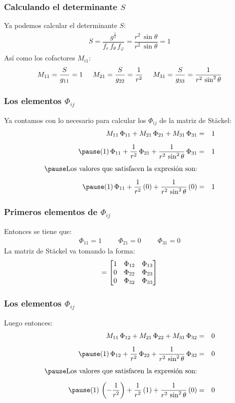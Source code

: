 \documentclass[12pt]{beamer}
\begin{document}
\begin{frame}
\frametitle{Calculando el determinante $S$}
Ya podemos calcular el determinante $S$:
\pause
\begin{align*}
S = \dfrac{g^{\frac{1}{2}}}{f_{r} \, f_{\theta} \, f_{\varphi}} = \dfrac{r^{2} \, \sin \theta}{r^{2} \, \sin \theta} = 1
\end{align*}
\pause
Así como los cofactores $M_{i1}$:
\pause
\begin{align*}
M_{11} = \dfrac{S}{g_{11}} = 1 \hspace{0.5cm} M_{21} = \dfrac{S}{g_{22}} = \dfrac{1}{r^{2}} \hspace{0.5cm} M_{31} = \dfrac{S}{g_{33}} = \dfrac{1}{r^{2} \, \sin^{2} \theta}
\end{align*}
\end{frame}
\begin{frame}
\frametitle{Los elementos $\Phi_{ij}$}
Ya contamos con lo necesario para calcular los $\Phi_{ij}$ de la matriz de Stäckel:
\begin{eqnarray*}
M_{11} \, \Phi_{11} + M_{21} \, \Phi_{21} + M_{31} \, \Phi_{31} &=& 1 \\[0.5em] \pause
(1) \, \Phi_{11} + \dfrac{1}{r^{2}} \, \Phi_{21} + \dfrac{1}{r^{2} \, \sin^{2} \theta}  \, \Phi_{31} &=& 1 \\[0.5em] \pause
\mbox{Los valores que satisfacen la expresión son:} \\[0.5em] \pause
(1) \, \Phi_{11} + \dfrac{1}{r^{2}} \, (0) + \dfrac{1}{r^{2} \, \sin^{2} \theta}  \, (0) &=& 1
\end{eqnarray*}
\end{frame}
\begin{frame}
\frametitle{Primeros elementos de $\Phi_{ij}$}
Entonces se tiene que:
\pause
\begin{align*}
\Phi_{11} = 1 \hspace{1cm} \Phi_{21} = 0 \hspace{1cm} \Phi_{31} = 0 
\end{align*}
\pause
La matriz de Stäckel va tomando la forma:
\pause
\begin{align*}
[S] = \mqty[
1 & \Phi_{12} & \Phi_{13} \\
0 & \Phi_{22} & \Phi_{23} \\
0 & \Phi_{32} & \Phi_{33}
]
\end{align*}  
\end{frame}
\begin{frame}
\frametitle{Los elementos $\Phi_{ij}$}
Luego entonces:
\begin{eqnarray*}
M_{11} \, \Phi_{12} + M_{21} \, \Phi_{22} + M_{31} \, \Phi_{32} &=& 0 \\[0.5em] \pause
(1) \, \Phi_{12} + \dfrac{1}{r^{2}} \, \Phi_{22} + \dfrac{1}{r^{2} \, \sin^{2} \theta}  \, \Phi_{32} &=& 0 \\[0.5em] \pause
\mbox{Los valores que satisfacen la expresión son:} \\[0.5em] \pause
(1) \, \left( - \dfrac{1}{r^{2}} \right) + \dfrac{1}{r^{2}} \, (1) + \dfrac{1}{r^{2} \, \sin^{2} \theta}  \, (0) &=& 0
\end{eqnarray*}
\end{frame}
\end{document}
